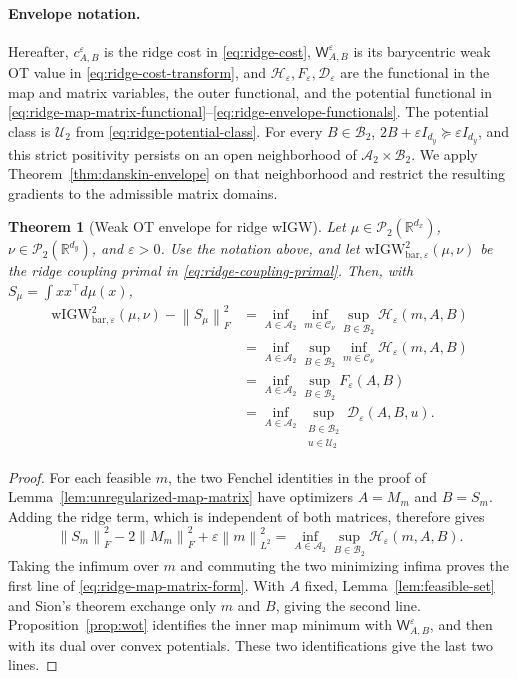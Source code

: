 \documentclass[11pt]{article}
\newcommand{\R}{\mathbb R}
\newcommand{\cP}{\mathcal P}
\newcommand{\cU}{\mathcal U}
\newcommand{\norm}[1]{\left\lVert #1\right\rVert}
\newcommand{\wIGWeps}{\mathrm{wIGW}_{\mathrm{bar},\varepsilon}}
\theoremstyle{plain}
\newtheorem{theorem}{Theorem}[section]
\theoremstyle{definition}
\theoremstyle{remark}
\begin{document}
\paragraph{Envelope notation.}
Hereafter, \(c_{A,B}^\varepsilon\) is the ridge cost in
\eqref{eq:ridge-cost}, \(\mathsf W_{A,B}^\varepsilon\) is its barycentric weak
OT value in \eqref{eq:ridge-cost-transform}, and
\(\mathcal H_\varepsilon,F_\varepsilon,\mathcal D_\varepsilon\) are the
functional in the map and matrix variables, the outer functional, and the
potential functional in
\eqref{eq:ridge-map-matrix-functional}--\eqref{eq:ridge-envelope-functionals}.
The potential class is \(\cU_2\) from \eqref{eq:ridge-potential-class}.
For every \(B\in\mathcal B_2\),
\(2B+\varepsilon I_{d_y}\succeq\varepsilon I_{d_y}\), and this strict
positivity persists on an open neighborhood of
\(\mathcal A_2\times\mathcal B_2\). We apply
Theorem~\ref{thm:danskin-envelope} on that neighborhood and restrict the
resulting gradients to the admissible matrix domains.

\begin{theorem}[Weak OT envelope for ridge wIGW]\label{thm:ridge-dual}
Let \(\mu\in\cP_2(\R^{d_x})\), \(\nu\in\cP_2(\R^{d_y})\), and
\(\varepsilon>0\). Use the notation above, and let
\(\wIGWeps^2(\mu,\nu)\) be the ridge coupling primal in
\eqref{eq:ridge-coupling-primal}.
Then, with \(S_\mu=\int xx^\top d\mu(x)\),
\begin{equation}\label{eq:ridge-map-matrix-form}
\begin{aligned}
 \wIGWeps^2(\mu,\nu)-\norm{S_\mu}_F^2
 &=\inf_{A\in\mathcal A_2}\inf_{m\in\mathcal C_\nu}
   \sup_{B\in\mathcal B_2}\mathcal H_\varepsilon(m,A,B)\\
 &=\inf_{A\in\mathcal A_2}\sup_{B\in\mathcal B_2}
   \inf_{m\in\mathcal C_\nu}\mathcal H_\varepsilon(m,A,B)\\
 &=\inf_{A\in\mathcal A_2}\sup_{B\in\mathcal B_2}
   F_\varepsilon(A,B)\\
 &=\inf_{A\in\mathcal A_2}
   \sup_{\substack{B\in\mathcal B_2\\u\in\cU_2}}
   \mathcal D_\varepsilon(A,B,u).
\end{aligned}
\end{equation}
\end{theorem}

\begin{proof}
For each feasible $m$, the two Fenchel identities in the proof of
Lemma~\ref{lem:unregularized-map-matrix} have optimizers $A=M_m$ and
$B=S_m$. Adding the ridge term, which is independent of both matrices, therefore
gives
\[
 \norm{S_m}_F^2-2\norm{M_m}_F^2+\varepsilon\norm m_{L^2}^2
 =\inf_{A\in\mathcal A_2}\sup_{B\in\mathcal B_2}
   \mathcal H_\varepsilon(m,A,B).
\]
Taking the infimum over $m$ and commuting the two minimizing infima proves the
first line of \eqref{eq:ridge-map-matrix-form}. With $A$ fixed,
Lemma~\ref{lem:feasible-set} and Sion's theorem \cite{Sion} exchange only $m$
and $B$, giving the second line. Proposition~\ref{prop:wot} identifies the
inner map minimum with $\mathsf W_{A,B}^\varepsilon$, and then with its dual over
convex potentials. These two identifications give the last two lines.
\end{proof}
\end{document}
